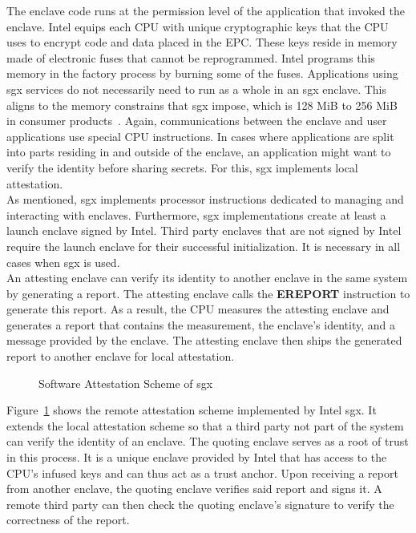 The enclave code runs at the permission level of the application that invoked
the enclave. Intel equips each CPU with unique cryptographic keys that the CPU
uses to encrypt code and data placed in the EPC. These keys reside in memory
made of electronic fuses that cannot be reprogrammed. Intel programs this memory
in the factory process by burning some of the fuses. Applications using
\gls{sgx} services do not necessarily need to run as a whole in an \gls{sgx}
enclave. This aligns to the memory constrains that \gls{sgx} impose, which is
128 MiB to 256 MiB in consumer products~\cite{enclave_size}. Again,
communications between the enclave and user applications use special CPU
instructions. In cases where applications are split into parts residing in and
outside of the enclave, an application might want to verify the identity before
sharing secrets. For this, \gls{sgx} implements local attestation.\\

As mentioned, \gls{sgx} implements processor instructions dedicated to managing
and interacting with enclaves. Furthermore, \gls{sgx} implementations create at
least a launch enclave signed by Intel. Third party enclaves that are not signed
by Intel require the launch enclave for their successful initialization. It is
necessary in all cases when \gls{sgx} is used.\\

An attesting enclave can verify its identity to another enclave in the same
system by generating a report. The attesting enclave calls the \textbf{EREPORT}
instruction to generate this report. As a result, the CPU measures the attesting
enclave and generates a report that contains the measurement, the enclave's
identity, and a message provided by the enclave. The attesting enclave then
ships the generated report to another enclave for local attestation.
\begin{center}
  \begin{figure}
    \centering
    
    \caption{Software Attestation Scheme of \gls{sgx}}
    \label{fig:state:tee:sgx_attestation}
  \end{figure}
\end{center}
Figure~\ref{fig:state:tee:sgx_attestation} shows the remote attestation scheme
implemented by Intel \gls{sgx}. It extends the local attestation scheme so that
a third party not part of the system can verify the identity of an enclave. The
quoting enclave serves as a root of trust in this process. It is a unique
enclave provided by Intel that has access to the CPU's infused keys and can thus
act as a trust anchor. Upon receiving a report from another enclave, the quoting
enclave verifies said report and signs it. A remote third party can then check
the quoting enclave's signature to verify the correctness of the report.

